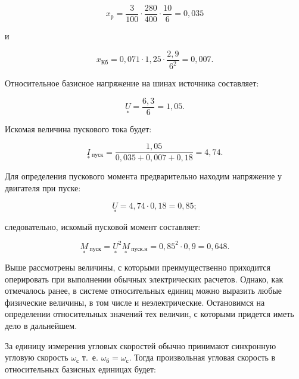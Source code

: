 \begin{small}
	\begin{equation*}
		{x_{\text{р}} = \frac{3}{100} \cdot \frac{280}{400} \cdot \frac{10}{6} = 0,035} 
	\end{equation*}

	и

	\begin{equation*}
		{x_{\text{Кб}} = 0,071 \cdot 1,25 \cdot \frac{2,9}{6^2} = 0,007}.
	\end{equation*}

	Относительное базисное напряжение на шинах источника составляет:

	\begin{equation*}
		{\underset{*}{U} = \frac{6,3}{6} = 1,05}.
	\end{equation*}
	
	Искомая величина пускового тока будет:
	
	\begin{equation*}
		{\underset{*}{I}\!\,_{\text{пуск}} = \frac{1,05}{0,035 + 0,007 + 0,18} = 4,74}.
	\end{equation*}
	
	Для определения пускового момента предварительно находим напряжение у двигателя при пуске:
	
	\begin{equation*}
		{\underset{*}{U} = 4,74 \cdot 0,18 = 0,85};
	\end{equation*}	
	
	следовательно, искомый пусковой момент составляет:
	
	\begin{equation*}
		{\underset{*}{M}\!\,_{\text{пуск}} = \underset{*}{U}^2 \underset{*}{M}\!\,_{\text{пуск.н}} = 0,85^2 \cdot 0,9 = 0,648}.
	\end{equation*}
\vspace{1pc}		
	
\end{small}

Выше рассмотрены величины, с которыми преимущественно приходится оперировать при выполнении обычных электрических расчетов. Однако, как отмечалось ранее, в системе относительных единиц можно выразить любые физические величины, в том числе и неэлектрические. Остановимся на определении относительных значений тех величин, с которыми придется иметь дело в дальнейшем.

За единицу измерения угловых скоростей обычно принимают синхронную угловую скорость $ \omega_{\text{с}} $  т.~е.  $ \omega_{\text{б}} = \omega_{\text{с}} $. Тогда произвольная угловая скорость в относительных базисных единицах будет:

